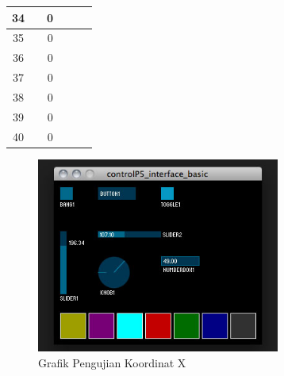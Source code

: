 \begin{table}[]
\begin{tabular}{|c|c|c|c|c|c|}
 			34                                           &                                  & 0                                &                                  &                                  &                                                     \\ \hline
 			35                                           &                                  & 0                                &                                  &                                  &                                                     \\ \hline
 			36                                           &                                  & 0                                &                                  &                                  &                                                     \\ \hline
 			37                                           &                                  & 0                                &                                  &                                  &                                                     \\ \hline
 			38                                           &                                  & 0                                &                                  &                                  &                                                     \\ \hline
 			39                                           &                                  & 0                                &                                  &                                  &                                                     \\ \hline
 			40                                           &                                  & 0                                &                                  &                                  &                                                     \\ \hline
 		\end{tabular}
 	\end{table}
	\begin{figure}[H]
	\centering
	\includegraphics[width=8cm]{gambar/controlp5.jpg}
	\caption{Grafik Pengujian Koordinat X}
	\label{pic.koordinatx}
\end{figure}

